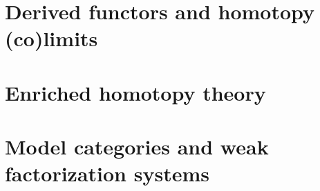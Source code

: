\documentclass[11pt, letterpaper]{report}
\begin{document}
\part{Derived functors and homotopy (co)limits}






\part{Enriched homotopy theory}




\part{Model categories and weak factorization systems}








\end{document}
